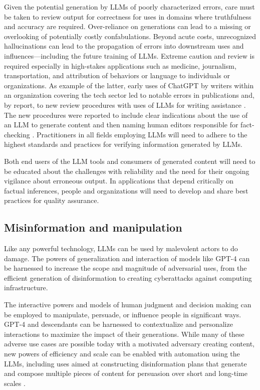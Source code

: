 Given the potential generation by LLMs of poorly characterized errors, care must be taken to review output for correctness for uses in domains where truthfulness and accuracy are required. Over-reliance on generations can lead to a missing or overlooking of potentially costly confabulations. Beyond acute costs, unrecognized hallucinations can lead to the propagation of errors into downstream uses and influences---including the future training of LLMs.  Extreme caution and review is required especially in high-stakes applications such as medicine, journalism, transportation, and attribution of behaviors or language to individuals or organizations.  As example of the latter, early uses of ChatGPT by writers within an organization covering the tech sector led to notable errors in publications and, by report, to new review procedures with uses of LLMs for writing assistance \cite{CNETpause2023}. The new procedures were reported to include clear indications about the use of an LLM to generate content and then naming human editors responsible for fact-checking \cite{CNETdirectorstatement2023}. Practitioners in all fields employing LLMs will need to adhere to the highest standards and practices for verifying information generated by LLMs.  

Both end users of the LLM tools and consumers of generated content will need to be educated about the challenges with reliability and the need for their ongoing vigilance about erroneous output. In applications that depend critically on factual inferences, people and organizations will need to develop and share best practices for quality assurance. 

\subsection{Misinformation and manipulation} 

Like any powerful technology, LLMs can be used by malevolent actors to do damage. The powers of generalization and interaction of models like {GPT-4} can be harnessed to increase the scope and magnitude of adversarial uses, from the efficient generation of disinformation to creating \hbox{cyberattacks} against computing infrastructure. 

The interactive powers and models of human judgment and decision making can be employed to manipulate, persuade, or influence people in significant ways. {GPT-4} and descendants can be harnessed to contextualize and personalize interactions to maximize the impact of their generations. While many of these adverse use cases are possible today with a motivated adversary creating content, new powers of efficiency and scale can be enabled with automation using the LLMs, including uses aimed at constructing disinformation plans that generate and compose multiple pieces of content for persuasion over short and long-time scales \cite{disinfoICMI2022}.  

